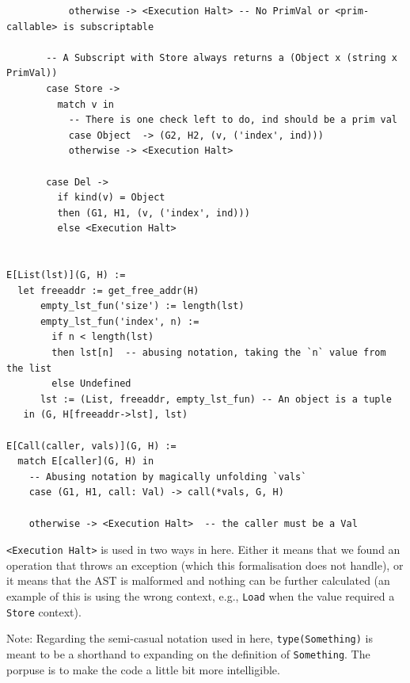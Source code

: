 \documentclass[
11pt, %
english, %
singlespacing, %
headsepline, %
]{MastersDoctoralThesis} %
\begin{document}
\begin{verbatim}
           otherwise -> <Execution Halt> -- No PrimVal or <prim-callable> is subscriptable

       -- A Subscript with Store always returns a (Object x (string x PrimVal))
       case Store ->
         match v in
           -- There is one check left to do, ind should be a prim val
           case Object  -> (G2, H2, (v, ('index', ind)))
           otherwise -> <Execution Halt>

       case Del ->
         if kind(v) = Object
         then (G1, H1, (v, ('index', ind)))
         else <Execution Halt>


E[List(lst)](G, H) :=
  let freeaddr := get_free_addr(H)
      empty_lst_fun('size') := length(lst)
      empty_lst_fun('index', n) :=
        if n < length(lst)
        then lst[n]  -- abusing notation, taking the `n` value from the list
        else Undefined
      lst := (List, freeaddr, empty_lst_fun) -- An object is a tuple
   in (G, H[freeaddr->lst], lst)

E[Call(caller, vals)](G, H) :=
  match E[caller](G, H) in
    -- Abusing notation by magically unfolding `vals`
    case (G1, H1, call: Val) -> call(*vals, G, H)

    otherwise -> <Execution Halt>  -- the caller must be a Val
\end{verbatim}

\texttt{\textless{}Execution\ Halt\textgreater{}} is used in two ways in
here. Either it means that we found an operation that throws an
exception (which this formalisation does not handle), or it means that
the AST is malformed and nothing can be further calculated (an example
of this is using the wrong context, e.g., \texttt{Load} when the value
required a \texttt{Store} context).

Note: Regarding the semi-casual notation used in here,
\texttt{type(Something)} is meant to be a shorthand to expanding on the
definition of \texttt{Something}. The porpuse is to make the code a
little bit more intelligible.

\iffalse
\end{document}
